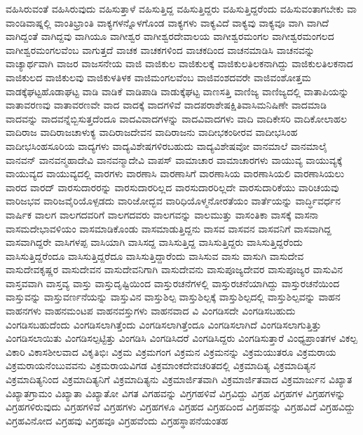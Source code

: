 {ವಹಿಸಿರುವಂತೆ
ವಹಿಸಿರುವುದು
ವಹಿಸುತ್ತಾಳೆ
ವಹಿಸುತ್ತಿದ್ದ
ವಹಿಸುತ್ತಿದ್ದರು
ವಹಿಸುತ್ತಿದ್ದರೆಂದು
ವಹಿಸುವಂತಾಗಬೇಕು
ವಾ
ವಾಂಡಿವಾಷ್ನಲ್ಲಿ
ವಾಂತಿಭ್ರಾಂತಿ
ವಾಕ್ಯಗಳನ್ನೊಳಗೊಂಡ
ವಾಕ್ಯಗಳು
ವಾಕ್ಯವಿದೆ
ವಾಕ್ಯವು
ವಾಕ್ಯವೂ
ವಾಗಿ
ವಾಗಿದೆ
ವಾಗಿದ್ದಂತೆ
ವಾಗಿದ್ದವು
ವಾಗಿಯೂ
ವಾಗೀಶ್ವರ
ವಾಗೀಶ್ವರದೇವಾಲಯ
ವಾಗೀಶ್ವರಮಂಗಲ
ವಾಗೀಶ್ವರಮಂಗಲದ
ವಾಗೀಶ್ವರಮಂಗಲವೆಂಬ
ವಾಗುತ್ತದೆ
ವಾಚಕ
ವಾಚಕಗಳಿಂದ
ವಾಚಕದಿಂದ
ವಾಚನಮಾಡಿಸಿ
ವಾಚನವನ್ನು
ವಾಚ್ಯಾರ್ಥವಾಗಿ
ವಾಜರ
ವಾಜಸನೇಯ
ವಾಜಿ
ವಾಜಿಕುಲ
ವಾಜಿಕುಲಕ್ಕೆ
ವಾಜಿಕುಲತಿಲಕನಾಗಿದ್ದು
ವಾಜಿಕುಲತಿಲಕನಾದ
ವಾಜಿಕುಲದ
ವಾಜಿಕುಲವು
ವಾಜಿಕುಳತಿಳಕ
ವಾಜಿಮಂಗಲವೆಂಬ
ವಾಜಿವಂಶದವರೇ
ವಾಜಿವಂಶೋತ್ತಮ
ವಾಡಕ್ಕೆಘಟ್ಟಹೊಡಾಘಟ್ಟ
ವಾಡಿ
ವಾಡಿಕೆ
ವಾಡಿಪಾಡಿ
ವಾಡುಕ್ಕೆಘಟ್ಟ
ವಾಣಸತ್ತಿ
ವಾಣಿಜ್ಯ
ವಾಣಿಜ್ಯದಲ್ಲಿ
ವಾತಾಪಿಯನ್ನು
ವಾತಾವರಣವು
ವಾತಾವರಣವೇ
ವಾದ
ವಾದಕ್ಕೆ
ವಾದಗಳಿವೆ
ವಾದಪರಾಶೇಷಕ್ಷಿತಿವಾಸಿಮನಿಷಿಣೇ
ವಾದಮಾಡಿ
ವಾದವನ್ನು
ವಾದವನ್ನೆಬ್ಬಿಸುತ್ತದೆಂದೂ
ವಾದವಿವಾದಗಳನ್ನು
ವಾದವಿವಾದಗಳು
ವಾದಿ
ವಾದಿಕೇಸರಿ
ವಾದಿಕೋಲಾಹಲ
ವಾದಿರಾಜ
ವಾದಿರಾಜಚಾಳುಕ್ಯ
ವಾದಿರಾಜದೇವನ
ವಾದಿರಾಜನು
ವಾದೀಭಕಂಠೀರವ
ವಾದೀಭಸಿಂಹ
ವಾದೀಭಸಿಂಹಸೂರಿಯ
ವಾದ್ಯಗಳು
ವಾದ್ಯವಿಶೇಷಗಳಿರಬಹುದು
ವಾದ್ಯವಿಶೇಷವೋ
ವಾನಮಾಲೆ
ವಾನಮಾಲೈ
ವಾನವನ್
ವಾನವನ್ಮಹಾದೇವಿ
ವಾನವನ್ಮಾದೇವಿ
ವಾಪಸ್
ವಾಮಾಚಾರ
ವಾಮಾಚಾರಗಳು
ವಾಯುವ್ಯ
ವಾಯುವ್ಯಕ್ಕೆ
ವಾಯುವ್ಯದ
ವಾಯುವ್ಯದಲ್ಲಿ
ವಾರಗಳು
ವಾರಣಾಸಿ
ವಾರಣಾಸಿಗೆ
ವಾರಣಾಸಿಯ
ವಾರಣಾಸಿಯಲಿ
ವಾರಣಾಸಿಯಲು
ವಾರದ
ವಾರದ್
ವಾರಸುದಾರರನ್ನು
ವಾರಸುದಾರರಿಲ್ಲದ
ವಾರಸುದಾರರಿಲ್ಲದೇ
ವಾರಸುದಾರಿಕೆಯು
ವಾರಿಚಯವು
ವಾರಿಜಭವ
ವಾರಿಜವೈರಿಯೊಳ್ಪಡದು
ವಾರಿಜೋದ್ಭವ
ವಾರಿಧಿಯೊಳ್ಮನೋರತೆಯಂ
ವಾರ್ತೆಯನ್ನು
ವಾರ್ದ್ಧಿವರ್ಧನ
ವಾರ್ಷಿಕ
ವಾಲಗ
ವಾಲಗದವರಿಗೆ
ವಾಲಗದವರು
ವಾಲಗವನ್ನು
ವಾಲಮುತ್ತು
ವಾಸಂತಿಕಾ
ವಾಸಕ್ಕೆ
ವಾಸನಾ
ವಾಸಮದೇಭಾವಳಿಯಂ
ವಾಸಮಾಡಿಕೊಂಡು
ವಾಸಮಾಡುತ್ತಿದ್ದನು
ವಾಸವ
ವಾಸವನ
ವಾಸವನಿಗೆ
ವಾಸವಾಗಿದ್ದ
ವಾಸವಾಗಿದ್ದರೇ
ವಾಸಿಗಳಪ್ಪ
ವಾಸಿಯಾಗಿ
ವಾಸಿಸದ್ದ
ವಾಸಿಸುತ್ತಿದ್ದ
ವಾಸಿಸುತ್ತಿದ್ದರು
ವಾಸಿಸುತ್ತಿದ್ದರೆಂದು
ವಾಸಿಸುತ್ತಿದ್ದರೆಂದೂ
ವಾಸಿಸುತ್ತಿದ್ದರೆದೂ
ವಾಸಿಸುತ್ತಿದ್ದಾರೆಂದು
ವಾಸಿಸುವ
ವಾಸು
ವಾಸುಗಿ
ವಾಸುದೇವ
ವಾಸುದೇವಕೃಷ್ಣರ
ವಾಸುದೇವನ
ವಾಸುದೇವನಿಗಾಗಿ
ವಾಸುದೇವನು
ವಾಸುಪೂಜ್ಯದೇವರ
ವಾಸುಪೂಜ್ಯರ
ವಾಸುವಿನ
ವಾಸ್ತವವಾಗಿ
ವಾಸ್ತವ್ಯ
ವಾಸ್ತು
ವಾಸ್ತುದೃಷ್ಟಿಯಿಂದ
ವಾಸ್ತುರಚನೆಗಳಲ್ಲಿ
ವಾಸ್ತುರಚನೆಯಾಗಿದ್ದು
ವಾಸ್ತುರಚನೆಯಿಂದ
ವಾಸ್ತುವನ್ನು
ವಾಸ್ತುವರ್ಣನೆಯನ್ನು
ವಾಸ್ತುವಿನ
ವಾಸ್ತುಶಿಲ್ಪ
ವಾಸ್ತುಶಿಲ್ಪಕ್ಕೆ
ವಾಸ್ತುಶಿಲ್ಪದಲ್ಲಿ
ವಾಸ್ತುಶಿಲ್ಪವನ್ನು
ವಾಹನ
ವಾಹನಗಳು
ವಾಹನಮಂಟಪ
ವಾಹನವಸ್ತುಗಳು
ವಾಹನವಾದ
ವಿ
ವಿಂಗಡಿಸದೇ
ವಿಂಗಡಿಸಬಹುದು
ವಿಂಗಡಿಸಬಹುದೆಂದು
ವಿಂಗಡಿಸಲಾಗಿತ್ತೆಂದು
ವಿಂಗಡಿಸಲಾಗಿತ್ತೆಂದೂ
ವಿಂಗಡಿಸಲಾಗಿದೆ
ವಿಂಗಡಿಸಲಾಗುತ್ತಿತ್ತು
ವಿಂಗಡಿಸಲಾಯಿತು
ವಿಂಗಡಿಸಲ್ಪಟ್ಟಿತ್ತು
ವಿಂಗಡಿಸಿ
ವಿಂಗಡಿಸಿದರೆ
ವಿಂಗಡಿಸಿದ್ದರು
ವಿಂಗಡಿಸುತ್ತಾರೆ
ವಿಂಧ್ಯಪ್ರಾಂತಗಳ
ವಿಕಲ್ಪ
ವಿಕಾರಿ
ವಿಕಾಸಶೀಲವಾದ
ವಿಕೃತಿಭಿಃ
ವಿಕ್ರಮ
ವಿಕ್ರಮಗಂಗ
ವಿಕ್ರಮನ
ವಿಕ್ರಮನನ್ನು
ವಿಕ್ರಮಯುತರೂ
ವಿಕ್ರಮರಾಯ
ವಿಕ್ರಮರಾಯನೆಂಬುವವನು
ವಿಕ್ರಮರಾಯವಿಗಡ
ವಿಕ್ರಮಾಂಕದೇವಚರಿತದಲ್ಲಿ
ವಿಕ್ರಮಾದಿತ್ಯ
ವಿಕ್ರಮಾದಿತ್ಯನ
ವಿಕ್ರಮಾದಿತ್ಯನಿಂದ
ವಿಕ್ರಮಾದಿತ್ಯನಿಗೆ
ವಿಕ್ರಮಾದಿತ್ಯನು
ವಿಕ್ರಮಾರ್ಜಿತವಾಗಿ
ವಿಕ್ರಮಾರ್ಜಿತವಾದ
ವಿಕ್ರಮಾರ್ಜುನ
ವಿಖ್ಯಾತ
ವಿಖ್ಯಾತಗ್ರಾಮಂ
ವಿಖ್ಯಾತಾ
ವಿಖ್ಯಾತೋ
ವಿಗತ
ವಿಗಹವನ್ನು
ವಿಗ್ರಗಹಳಿವೆ
ವಿಗ್ರವಿದ್ದು
ವಿಗ್ರಹ
ವಿಗ್ರಹಗಳ
ವಿಗ್ರಹಗಳನ್ನು
ವಿಗ್ರಹಗಳಿರುವುದು
ವಿಗ್ರಹಗಳಿವೆ
ವಿಗ್ರಹಗಳು
ವಿಗ್ರಹಗಳೂ
ವಿಗ್ರಹದ
ವಿಗ್ರಹದಿಂದ
ವಿಗ್ರಹವನ್ನು
ವಿಗ್ರಹವಿದೆ
ವಿಗ್ರಹವಿದ್ದು
ವಿಗ್ರಹವಿನೋದ
ವಿಗ್ರಹವು
ವಿಗ್ರಹವೂ
ವಿಗ್ರಹವೆಂದು
ವಿಗ್ರಹಸ್ಥಾಪನೆಯಂತಹ
}
